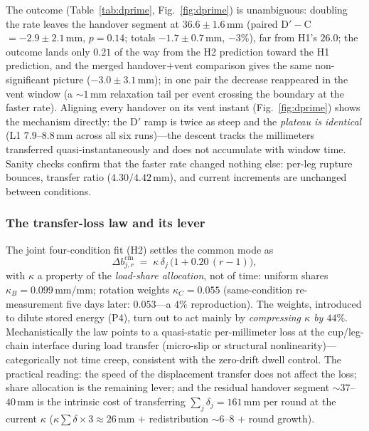 \documentclass[journal]{IEEEtran}
\begin{document}
The outcome (Table~\ref{tab:dprime}, Fig.~\ref{fig:dprime}) is
unambiguous: doubling the rate leaves the handover segment at
$36.6\pm1.6$\,mm (paired D$'{-}$C $=-2.9\pm2.1$\,mm, $p=0.14$; totals
$-1.7\pm0.7$\,mm, $-3\%$), far from H1's $26.0$; the outcome lands only $0.21$ of the way from
the H2 prediction toward the H1 prediction, and the merged
handover$+$vent comparison gives the same non-significant picture
($-3.0\pm3.1$\,mm); in one pair the decrease reappeared in the vent
window (a ${\sim}1$\,mm relaxation tail per event crossing the boundary
at the faster rate). Aligning every handover on its vent instant
(Fig.~\ref{fig:dprime}) shows the mechanism directly: the D$'$ ramp is
twice as steep and the \emph{plateau is identical} (L1
$7.9$--$8.8$\,mm across all six runs)---the descent tracks the millimeters transferred
quasi-instantaneously and does not accumulate with window time. Sanity
checks confirm that the faster rate changed nothing else:
per-leg rupture bounces, transfer ratio ($4.30/4.42$\,mm), and current
increments are unchanged between conditions.

\subsubsection{The transfer-loss law and its lever}
The joint four-condition fit (H2) settles the common mode as
\begin{equation}
\Delta b^{\mathrm{cm}}_{j,r} \;=\; \kappa\,\delta_j\,
\bigl(1 + 0.20\,(r{-}1)\bigr),
\label{eq:kappa}
\end{equation}
with $\kappa$ a property of the \emph{load-share allocation}, not of
time: uniform shares $\kappa_B = 0.099$\,mm/mm; rotation weights
$\kappa_C = 0.055$ (same-condition re-measurement five days later:
$0.053$---a $4\%$ reproduction). The weights, introduced to dilute
stored energy (P4), turn out to act mainly by \emph{compressing
$\kappa$ by $44\%$}. Mechanistically the law points to a quasi-static
per-millimeter loss at the cup/leg-chain interface during load transfer
(micro-slip or structural nonlinearity)---categorically not time creep,
consistent with the zero-drift dwell control. The practical reading:
the speed of the displacement transfer does not affect the loss; share
allocation is the remaining lever; and the residual handover segment
${\sim}37$--$40$\,mm is the intrinsic cost of transferring
$\sum_j\delta_j = 161$\,mm per round at the current
$\kappa$ ($\kappa\sum\delta\times3 \approx 26$\,mm $+$ redistribution
${\sim}6$--$8$ $+$ round growth).
\end{document}
